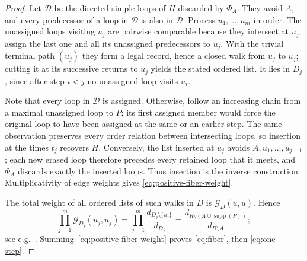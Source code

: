 \documentclass[11pt]{article}
\numberwithin{equation}{section}
\newcommand{\1}{\mathbf{1}}
\newcommand{\supp}{\operatorname{supp}}
\newcommand{\Gc}{\mathcal G}
\begin{document}
\begin{proof}
Let $\mathcal D$ be the directed simple loops of $H$ discarded by $\Phi_A$.  They
avoid $A$, and every predecessor of a loop in $\mathcal D$ is also in
$\mathcal D$.  Process $u_1,\ldots,u_m$ in order.  The unassigned loops visiting
$u_j$ are pairwise comparable because they intersect at $u_j$; assign the
last one and all its unassigned predecessors to $u_j$.  With the trivial terminal path
$(u_j)$ they form a legal record, hence a closed walk from $u_j$ to $u_j$; cutting it at its successive returns to $u_j$ yields the stated ordered list.  It lies in $D_j$, since after step
$i<j$ no unassigned loop visits $u_i$.

Note that every loop in $\mathcal D$ is assigned. Otherwise, follow an increasing chain from
a maximal unassigned loop to $P$; its first assigned member would force the
original loop to have been assigned at the same or an earlier step.  The
same observation preserves every order relation between intersecting loops,
so insertion at the times $t_j$ recovers $H$.  Conversely, the list inserted
at $u_j$ avoids $A,u_1,\ldots,u_{j-1}$; each new erased loop therefore
precedes every retained loop that it meets, and $\Phi_A$ discards exactly the
inserted loops.  Thus insertion is the inverse construction.  Multiplicativity of edge weights gives
\eqref{eq:positive-fiber-weight}.

The total weight of all ordered lists of such walks in $D$ is
$\Gc_D(u,u)$.  Hence
\[
 \prod_{j=1}^m\Gc_{D_j}(u_j,u_j)
 =\prod_{j=1}^m\frac{d_{D_j\setminus\{u_j\}}}{d_{D_j}}
 =\frac{d_{R\setminus(A\cup\supp(P))}}{d_{R\setminus A}};
\]
see e.g.~\cite[Proposition~3.5]{Lawler2018}.
Summing~\eqref{eq:positive-fiber-weight} proves \eqref{eq:fiber}, then
\eqref{eq:one-step}.
\end{proof}
\end{document}
